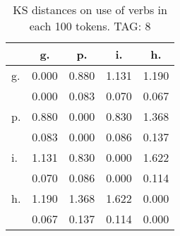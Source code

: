 \begin{table}[h!]
\begin{center}
\begin{tabular}{| l | c | c | c | c |}\hline
 & g. & p. & i. & h. \\\hline
g. & 0.000  & 0.880  & 1.131  & 1.190 \\\hline
 & 0.000  & 0.083  & 0.070  & 0.067 \\\hline
p. & 0.880  & 0.000  & 0.830  & 1.368 \\\hline
 & 0.083  & 0.000  & 0.086  & 0.137 \\\hline
i. & 1.131  & 0.830  & 0.000  & 1.622 \\\hline
 & 0.070  & 0.086  & 0.000  & 0.114 \\\hline
h. & 1.190  & 1.368  & 1.622  & 0.000 \\\hline
 & 0.067  & 0.137  & 0.114  & 0.000 \\\hline
\end{tabular}
\caption{KS distances on use of verbs in each 100 tokens. TAG: 8}
\end{center}
\end{table}